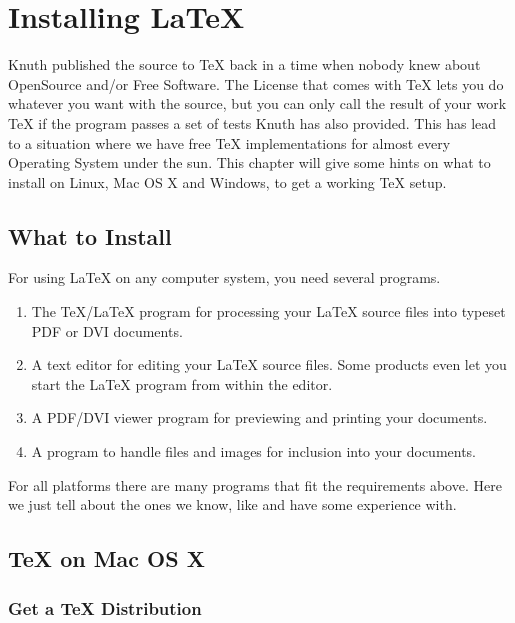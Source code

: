 \appendix
\chapter{Installing \LaTeX}
\begin{intro}
Knuth published the source to \TeX{} back in a time when nobody knew
about OpenSource and/or Free Software. The License that comes with \TeX{}
lets you do whatever you want with the source, but you can only call the
result of your work \TeX{} if the program passes a set of tests Knuth has
also provided. This has lead to a situation where we have free \TeX{}
implementations for almost every Operating System under the sun. This chapter
will give some hints on what to install on Linux, Mac OS X and Windows, to
get a working \TeX{} setup.
\end{intro}

\section{What to Install}

For using \LaTeX{} on any computer system, you need several programs.

\begin{enumerate}

\item The \TeX{}/\LaTeX{} program for processing your \LaTeX{} source files
into typeset PDF or DVI documents.

\item A text editor for editing your \LaTeX{} source files. Some products even let
you start the \LaTeX{} program from within the editor.

\item A PDF/DVI viewer program for previewing and printing your
documents.

\item A program to handle \PSi{} files and images for inclusion into
your documents.

\end{enumerate}

For all platforms there are many programs that fit the requirements above.
Here we just tell about the ones we know, like and have some experience
with.

\section{\TeX{} on Mac OS X}

\subsection{Get a \TeX{} Distribution}

